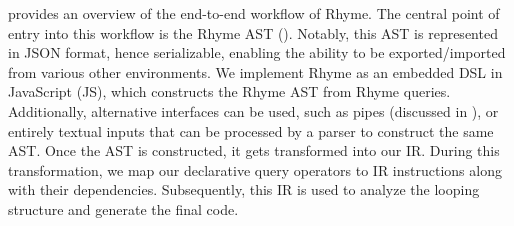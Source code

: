 \documentclass[runningheads]{llncs}
\newcommand{\lang}{Rhyme}
\begin{document}
 provides an overview of the end-to-end workflow of \lang{}.
The central point of entry into this workflow is the \lang{} AST ().
Notably, this AST is represented in JSON format, hence serializable, enabling the ability
to be exported/imported from various other environments.
We implement \lang{} as an embedded DSL in JavaScript (JS), 
which constructs the \lang{} AST from \lang{} queries.
Additionally, alternative interfaces can be used, such as pipes (discussed in ),
or entirely textual inputs that can be processed by a parser to construct the same AST.
Once the AST is constructed, it gets transformed into our IR.
During this transformation, we map our declarative query operators to IR instructions
along with their dependencies.
Subsequently, this IR is used to analyze the looping structure and generate the final
code.
\end{document}
